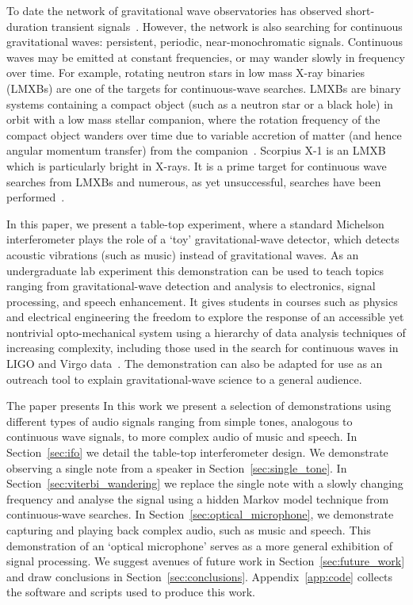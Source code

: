 \documentclass[paper-main.tex]{subfiles}
\begin{document}
To date the network of gravitational wave observatories has observed short-duration transient signals~\cite{GWTC-1:2018,GWOSC:online}. 
However, the network is also searching for continuous gravitational waves: persistent, periodic, near-monochromatic signals.
Continuous waves may be emitted at constant frequencies, or may wander slowly in frequency over time. 
For example, rotating neutron stars in low mass X-ray binaries (LMXBs) are one of the targets for continuous-wave searches. 
LMXBs are binary systems containing a compact object (such as a neutron star or a black hole) in orbit with a low mass stellar companion, where the rotation frequency of the compact object wanders over time due to variable accretion of matter (and hence angular momentum transfer) from the companion~\cite{xraybinaries:1997}. 
Scorpius X-1 is an LMXB which is particularly bright in X-rays. 
It is a prime target for continuous wave searches from LMXBs and numerous, as yet unsuccessful, searches have been performed~\cite{ScoX1O2Viterbi:2019,RadiometerO1O2:2019,SearchCrossCorrO1:2017}.


In this paper, we present a table-top experiment, where a standard Michelson interferometer plays the role of a `toy' gravitational-wave detector, which detects acoustic vibrations (such as music) instead of gravitational waves. 
As an undergraduate lab experiment this demonstration can be used to teach topics ranging from gravitational-wave detection and analysis to electronics, signal processing, and speech enhancement. 
It gives students in courses such as physics and electrical engineering the freedom to explore the response of an accessible yet nontrivial opto-mechanical system using a hierarchy of data analysis techniques of increasing complexity, including those used in the search for continuous waves in LIGO and Virgo data~\cite{ScoX1O2Viterbi:2019,ScoX1ViterbiO1:2017,SuvorovaEtAl:2017,SuvorovaEtAl:2017}.
The demonstration can also be adapted for use as an outreach tool to explain gravitational-wave science to a general audience. 


The paper presents 
In this work we present a selection of demonstrations using different types of audio signals ranging from simple tones, analogous to continuous wave signals, to more complex audio of music and speech. 
In Section~\ref{sec:ifo} we detail the table-top interferometer design. 
We demonstrate observing a single note from a speaker in Section~\ref{sec:single_tone}.
In Section~\ref{sec:viterbi_wandering} we replace the single note with a slowly changing frequency and analyse the signal using a hidden Markov model technique from continuous-wave searches. 
In Section~\ref{sec:optical_microphone}, we demonstrate capturing and playing back complex audio, such as music and speech. 
This demonstration of an `optical microphone' serves as a more general exhibition of signal processing. 
We suggest avenues of future work in Section~\ref{sec:future_work} and draw conclusions in Section~\ref{sec:conclusions}.
Appendix~\ref{app:code} collects the software and scripts used to produce this work. 
\end{document}
